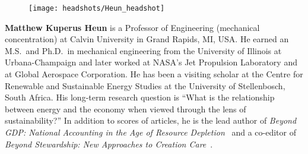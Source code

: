 \setlength{\intextsep}{-7pt}%
\setlength{\columnsep}{8pt}%
\begin{figure}
  \begin{center}
    \texttt{[image: headshots/Heun\_headshot]}
  \end{center}
\end{figure}
\textbf{Matthew Kuperus Heun} is a Professor of Engineering 
(mechanical concentration)
at Calvin University in Grand Rapids, MI, USA.
He earned an M.S.\ and Ph.D.\ in mechanical engineering from 
the University of Illinois at Urbana-Champaign and 
later worked at NASA's Jet Propulsion Laboratory and at Global Aerospace Corporation. 
He has been a visiting scholar at the Centre for Renewable and Sustainable Energy Studies 
at the University of Stellenbosch, South Africa. 
His long-term research question is 
``What is the relationship between energy and the economy when viewed through the lens of sustainability?''
In addition to scores of articles, he is the lead author of 
\emph{Beyond GDP: National Accounting in the Age of Resource Depletion}~\citep{Heun:2015aa} 
and a co-editor of
\emph{Beyond Stewardship: New Approaches to Creation Care}~\citep{Warners:2019aa}.





